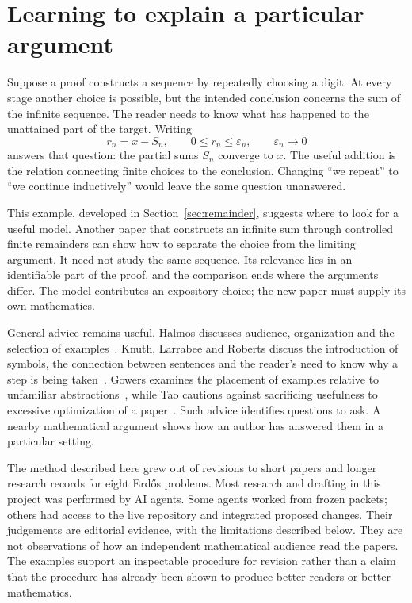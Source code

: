 \section{Learning to explain a particular argument}\label{sec:reading}

Suppose a proof constructs a sequence by repeatedly choosing a digit. At every
stage another choice is possible, but the intended conclusion concerns the sum
of the infinite sequence. The reader needs to know what has happened to the
unattained part of the target. Writing
\[
 r_n=x-S_n,\qquad 0\le r_n\le\varepsilon_n,\qquad
 \varepsilon_n\longrightarrow0
\]
answers that question: the partial sums $S_n$ converge to $x$. The useful
addition is the relation connecting finite choices to the conclusion. Changing
``we repeat'' to ``we continue inductively'' would leave the same question
unanswered.

This example, developed in Section~\ref{sec:remainder}, suggests where to look
for a useful model. Another paper that constructs an infinite sum through
controlled finite remainders can show how to separate the choice from the
limiting argument. It need not study the same sequence. Its relevance lies in
an identifiable part of the proof, and the comparison ends where the arguments
differ. The model contributes an expository choice; the new paper must supply
its own mathematics.

General advice remains useful. Halmos discusses audience, organization and the
selection of examples~\cite[\S\S3--4]{halmos}. Knuth, Larrabee and Roberts discuss
the introduction of symbols, the connection between sentences and the reader's
need to know why a step is being taken~\cite[\S1]{knuth}. Gowers examines the
placement of examples relative to unfamiliar abstractions~\cite{gowers}, while
Tao cautions against sacrificing usefulness to excessive optimization of a
paper~\cite{tao}. Such advice identifies questions to ask. A nearby mathematical
argument shows how an author has answered them in a particular setting.

The method described here grew out of revisions to short papers and longer
research records for eight Erd\H{o}s problems. Most research and drafting in
this project was performed by AI agents. Some agents worked from frozen packets;
others had access to the live repository and integrated proposed changes.
Their judgements are editorial evidence, with the limitations described below.
They are not observations of how an independent mathematical audience read the
papers. The examples support an inspectable procedure for revision rather than
a claim that the procedure has already been shown to produce better readers or
better mathematics.

